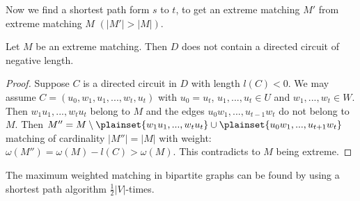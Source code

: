 Now we find a shortest path form $s$ to $t$, to get an extreme matching $M'$ 
from extreme matching $M$ $(|M'| > |M|)$.

\begin{thm}
	Let $M$ be an extreme matching. Then $D$ does not contain a directed circuit 
	of negative length.
\end{thm}

\begin{proof}
	Suppose $C$ is a directed circuit in $D$ with length $l(C) < 0$. We may assume 
	$C=(u_0, w_1, u_1, ..., w_t, u_t)$ with $u_0=u_t$, $u_1, ..., u_t \in U$ and 
	$w_1, ..., w_t \in W$. Then $w_1u_1, ..., w_tu_t$ belong to $M$ and the edges 
	$u_0w_1, ..., u_{t-1}w_t$ do not belong to $M$.
	Then $M''=M\setminus \plainset{w_1u_1, ..., w_tu_t} \cup \plainset{u_0w_1, ..., u_{t+1}w_t}$
	matching of cardinality $|M''| = |M|$ with weight: $\omega(M'') = \omega(M) - l(C) > \omega(M)$.
	This contradicts to $M$ being extreme.
\end{proof}

\begin{cor}
	The maximum weighted matching in bipartite graphs can be found by using a 
	shortest path algorithm $\frac{1}{2}|V|$-times.
\end{cor}
